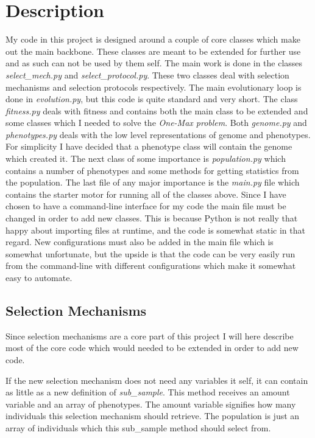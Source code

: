 \section{Description}\label{sec:description}
My code in this project is designed around a couple of core classes which make
out the main backbone. These classes are meant to be extended for further use
and as such can not be used by them self. The main work is done in the classes
\textit{select\_mech.py} and \textit{select\_protocol.py}. These two classes deal with
selection mechanisms and selection protocols respectively. The main evolutionary
loop is done in \textit{evolution.py}, but this code is quite standard and very short.
The class \textit{fitness.py} deals with fitness and contains both the main class to be
extended and some classes which I needed to solve the \textit{One-Max problem}.
Both \textit{genome.py} and \textit{phenotypes.py} deals with the low level
representations of genome and phenotypes. For simplicity I have decided that a
phenotype class will contain the genome which created it. The next class of some
importance is \textit{population.py} which contains a number of phenotypes and
some methods for getting statistics from the population. The last file of any
major importance is the \textit{main.py} file which contains the starter motor
for running all of the classes above. Since I have chosen to have a command-line
interface for my code the main file must be changed in order to add new classes.
This is because Python is not really that happy about importing files at
runtime, and the code is somewhat static in that regard. New configurations must
also be added in the main file which is somewhat unfortunate, but the upside is
that the code can be very easily run from the command-line with different
configurations which make it somewhat easy to automate.

\subsection{Selection Mechanisms}\label{sec:selection mechanisms}
Since selection mechanisms are a core part of this project I will here describe
most of the core code which would needed to be extended in order to add new
code.



If the new selection mechanism does not need any variables it self, it can
contain as little as a new definition of \textit{sub\_sample}. This method
receives an amount variable and an array of phenotypes. The amount variable
signifies how many individuals this selection mechanism should retrieve. The
population is just an array of individuals which this sub\_sample method should
select from.

